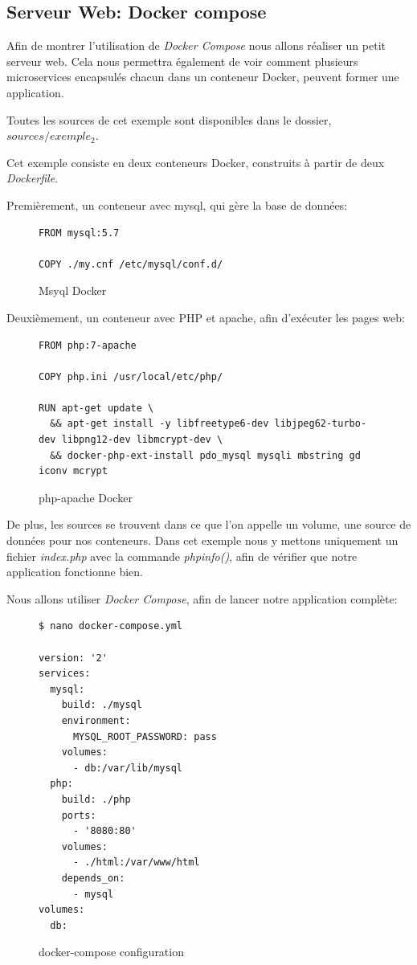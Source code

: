 \subsection{Serveur Web: Docker compose}
Afin de montrer l'utilisation de \emph{Docker Compose} nous allons réaliser un petit serveur web. Cela nous permettra également de voir comment plusieurs microservices encapsulés chacun dans un conteneur Docker, peuvent former une application.

Toutes les sources de cet exemple sont disponibles dans le dossier, \emph{$sources/exemple_2$}.

Cet exemple consiste en deux conteneurs Docker, construits à partir de deux \emph{Dockerfile}.

Premièrement, un conteneur avec mysql, qui gère la base de données:

\begin{figure}[H] 
\centering 
\begin{lstlisting}[frame=single]
FROM mysql:5.7

COPY ./my.cnf /etc/mysql/conf.d/
\end{lstlisting}
\caption[mysql Docker]{Msyql Docker}
\label{fig:mysqlDocker} 
\end{figure}

Deuxièmement, un conteneur avec PHP et apache, afin d'exécuter les pages web:

\begin{figure}[H] 
\centering 
\begin{lstlisting}[frame=single]
FROM php:7-apache

COPY php.ini /usr/local/etc/php/

RUN apt-get update \
  && apt-get install -y libfreetype6-dev libjpeg62-turbo-dev libpng12-dev libmcrypt-dev \
  && docker-php-ext-install pdo_mysql mysqli mbstring gd iconv mcrypt
\end{lstlisting}
\caption[php-apache Docker]{php-apache Docker}
\label{fig:phpApacheDocker} 
\end{figure}

De plus, les sources se trouvent dans ce que l'on appelle un volume, une source de données pour nos conteneurs. Dans cet exemple nous y mettons uniquement un fichier \emph{index.php} avec la commande \emph{phpinfo()}, afin de vérifier que notre application fonctionne bien.

Nous allons utiliser \emph{Docker Compose}, afin de lancer notre application complète:

\begin{figure}[H] 
\centering 
\begin{lstlisting}[frame=single]
$ nano docker-compose.yml

version: '2'
services:
  mysql:
    build: ./mysql
    environment:
      MYSQL_ROOT_PASSWORD: pass
    volumes:
      - db:/var/lib/mysql
  php:
    build: ./php
    ports:
      - '8080:80'
    volumes:
      - ./html:/var/www/html
    depends_on:
      - mysql
volumes:
  db:

\end{lstlisting}
\caption[Code - docker-compose configuration]{docker-compose configuration}
\label{fig:composeConfig} 
\end{figure}

